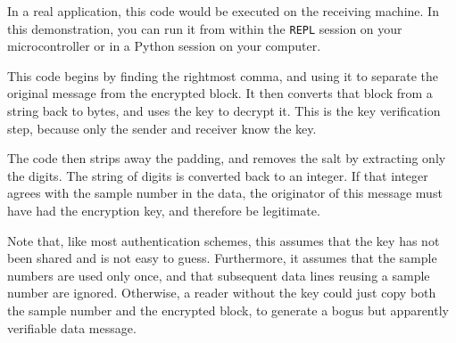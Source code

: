 \begin{enumerate}
	In a real application, this code would be executed on the receiving machine.
	In this demonstration, you can run it from within the \texttt{REPL} session on your microcontroller or in a Python session on your computer.
	
	\smallskip
	This code begins by finding the rightmost comma, and using it to separate the original message from the encrypted block.
	It then converts that block from a string back to bytes, and uses the key to decrypt it.
	This is the key verification step, because only the sender and receiver know the key.
	
	\smallskip
	The code then strips away the padding, and removes the salt by extracting only the digits.
	The string of digits is converted back to an integer.
	If that integer agrees with the sample number in the data, the originator of this message must have had the encryption key, and therefore be legitimate.

	\smallskip
	Note that, like most authentication schemes, this assumes that the key has not been shared and is not easy to guess.
	Furthermore, it assumes that the sample numbers are used only once, and that subsequent data lines reusing a sample number are ignored. 
	Otherwise, a reader without the key could just copy both the sample number and the encrypted block, to generate a bogus but apparently verifiable data message.

\end{enumerate}

